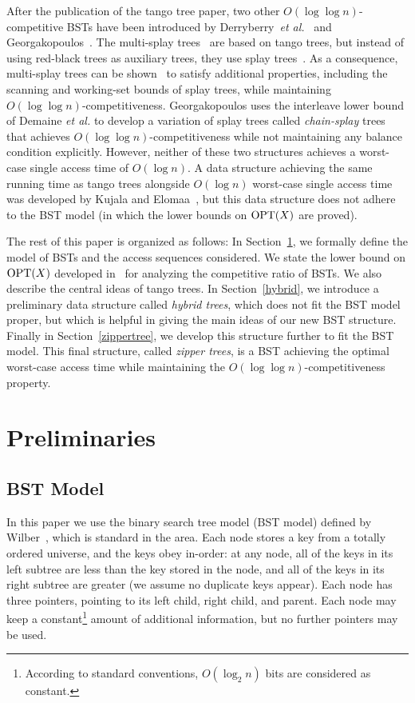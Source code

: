 \documentclass[letterpaper,11pt]{article}
\begin{document}
After the publication of the tango tree paper, two other $O(\log \log
n)$-competitive BSTs have been introduced by Derryberry~\emph{et
al.}~\cite{multisplay,MultisplayThesis} and
Georgakopoulos~\cite{loglognsplay}.  The multi-splay
trees~\cite{multisplay} are based on tango trees, but instead of using
red-black trees as auxiliary trees, they use splay trees~\cite{splay}. As a
consequence, multi-splay trees can be
shown~\cite{multisplay,MultisplayThesis} to satisfy additional properties,
including the scanning and working-set bounds of splay trees, while
maintaining $O(\log \log n)$-competitiveness.  Georgakopoulos uses the
interleave lower bound of Demaine {\em et al.} to develop a variation of
splay trees called {\em chain-splay} trees that achieves $O(\log \log
n)$-competitiveness while not maintaining any balance condition explicitly.
However, neither of these two structures achieves a worst-case single
access time of $O(\log n)$. A data structure achieving the same running
time as tango trees alongside $O(\log n)$ worst-case single access time was
developed by Kujala and Elomaa~\cite{poketree}, but this data structure
does not adhere to the BST model (in which the lower bounds on ${\rm
OPT}(X)$ are proved).

The rest of this paper is organized as follows: In
Section~\ref{preliminaries}, we formally define the model of BSTs
and the access sequences considered. We state the lower bound on ${\rm
OPT}(X)$ developed in~\cite{tango,wilber} for analyzing the competitive
ratio of BSTs. We also describe the central ideas of tango trees.  In
Section~\ref{hybrid}, we introduce a preliminary data structure called
\emph{hybrid trees}, which does not fit the BST model proper, but which is
helpful in giving the main ideas of our new BST structure. Finally in
Section~\ref{zippertree}, we develop this structure further to fit the BST
model. This final structure, called \emph{zipper trees}, is a BST achieving
the optimal worst-case access time while maintaining the $O(\log \log
n)$-competitiveness property.



\section{Preliminaries}
\label{preliminaries}

\subsection{BST Model}
\label{model}
In this paper we use the binary search tree model (BST model) defined
by Wilber~\cite{wilber}, which is standard in the area.  Each node stores a
key from a totally ordered universe, and the keys obey in-order: at any
node, all of the keys in its left subtree are less than the key stored in
the node, and all of the keys in its right subtree are greater (we assume
no duplicate keys appear). Each node has three pointers, pointing to its
left child, right child, and parent. Each node may keep a
constant\footnote{According to standard conventions, $O(\log_2 n)$ bits are
considered as constant.}  amount of additional information, but no further
pointers may be used.
\end{document}
